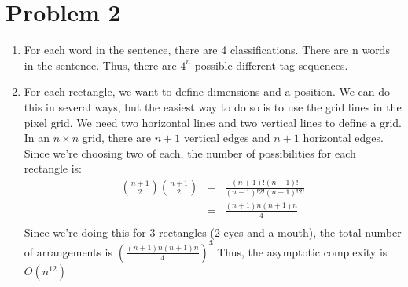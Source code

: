 \documentclass[12pt]{article}
\begin{document}
\section*{Problem 2}

\begin{enumerate}[label=(\alph*)]
  \item For each word in the sentence, there are 4 classifications. There are n words in the sentence. Thus, there are $4^n$ possible different tag sequences.
  
  \item For each rectangle, we want to define dimensions and a position. We can do this in several ways, but the easiest way to do so is to use the grid lines in the pixel grid. We need two horizontal lines and two vertical lines to define a grid. In an $n \times n$ grid, there are $n + 1$ vertical edges and $n + 1$ horizontal edges. Since we're choosing two of each, the number of possibilities for each rectangle is:
  \begin{eqnarray*}
  \binom{n+1}{2}\binom{n+1}{2} &=& \frac{(n+1)!(n+1)!}{(n-1)!2!(n-1)!2!}\\
  &=& \frac{(n+1)n(n+1)n}{4}\\
  \end{eqnarray*}
  Since we're doing this for 3 rectangles (2 eyes and a mouth), the total number of arrangements is $(\frac{(n+1)n(n+1)n}{4})^3$
  Thus, the asymptotic complexity is $O(n^{12})$


\end{enumerate}
\end{document}
